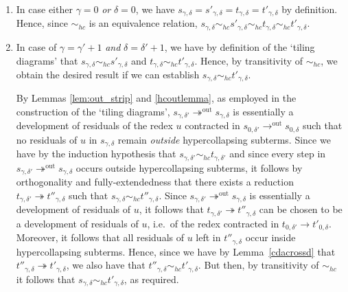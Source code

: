 \documentclass{LMCS}
\theoremstyle{plain}
\theoremstyle{definition}
\newcommand{\rew}{\rightarrow}
\newcommand{\trewt}{\twoheadrightarrow}
\newcommand{\out}{\trewt^\mathrm{out}}
\newcommand{\outs}{\rew^\mathrm{out}}
\newcommand{\simhc}{\sim_{hc}}
\begin{document}
\begin{enumerate}[$\bullet$]
\item
In case either $\gamma = 0$ \emph{or} $\delta = 0$, we have $s_{\gamma, \delta} = s'_{\gamma, \delta} = t_{\gamma, \delta} = t'_{\gamma, \delta}$ by definition. Hence, since $\simhc$ is an equivalence relation, $s_{\gamma, \delta} \simhc s'_{\gamma, \delta} \simhc t_{\gamma, \delta} \simhc t'_{\gamma, \delta}$.
\item
In case of $\gamma = \gamma' + 1$ \emph{and} $\delta = \delta' + 1$, we have by definition of the `tiling diagrams' that $s_{\gamma, \delta} \simhc s'_{\gamma, \delta}$ and $t_{\gamma, \delta} \simhc t'_{\gamma, \delta}$. Hence, by transitivity of $\simhc$, we obtain the desired result if we can establish $s_{\gamma, \delta} \simhc t'_{\gamma, \delta}$.

By Lemmas \ref{lem:out_strip} and \ref{hcoutlemma}, as employed in the construction of the `tiling diagrams', $s_{\gamma, \delta'} \out s_{\gamma, \delta}$ is essentially a development of residuals of the redex $u$ contracted in $s_{0, \delta'} \outs s_{0, \delta}$ such that no residuals of $u$ in $s_{\gamma, \delta}$ remain \emph{outside} hypercollapsing subterms. Since we have by the induction hypothesis that $s_{\gamma, \delta'} \simhc t_{\gamma, \delta'}$ and since every step in $s_{\gamma, \delta'} \out s_{\gamma, \delta}$ occurs outside hypercollapsing subterms, it follows by orthogonality and fully-extendedness that there exists a reduction $t_{\gamma, \delta'} \trewt t''_{\gamma, \delta}$ such that $s_{\gamma, \delta} \simhc t''_{\gamma, \delta}$. Since $s_{\gamma, \delta'} \out s_{\gamma, \delta}$ is essentially a development of residuals of $u$, it follows that $t_{\gamma, \delta'} \trewt t''_{\gamma, \delta}$ can be chosen to be a development of residuals of $u$, i.e.\ of the redex contracted in $t_{0, \delta'} \rew t'_{0, \delta}$. Moreover, it follows that all residuals of $u$ left in $t''_{\gamma, \delta}$ occur inside hypercollapsing subterms. Hence, since we have by Lemma~\ref{cdacrossd} that $t''_{\gamma, \delta} \trewt t'_{\gamma, \delta}$, we also have that $t''_{\gamma, \delta} \simhc t'_{\gamma, \delta}$. But then, by transitivity of $\simhc$ it follows that $s_{\gamma, \delta} \simhc t'_{\gamma, \delta}$, as required.
\end{enumerate}
\end{document}
